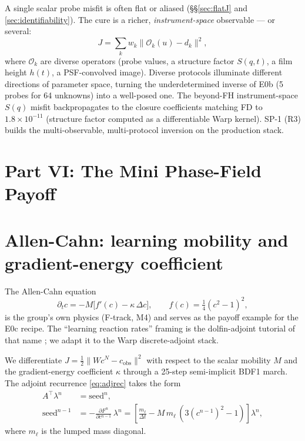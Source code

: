 \documentclass[11pt]{article}
\begin{document}
A single scalar probe misfit is often flat or aliased (\S\S\ref{sec:flatJ}
and \ref{sec:identifiability}).  The cure is a richer,
\emph{instrument-space} observable --- or several:
\begin{equation}
  J = \sum_k w_k \| \mathcal{O}_k(u) - d_k \|^2 ,
  \label{eq:multiJ}
\end{equation}
where $\mathcal{O}_k$ are diverse operators (probe values, a structure
factor $S(q,t)$, a film height $h(t)$, a PSF-convolved image).  Diverse
protocols illuminate different directions of parameter space, turning the
underdetermined inverse of E0b (5 probes for 64 unknowns) into a
well-posed one.  The beyond-FH instrument-space $S(q)$ misfit backpropagates
to the closure coefficients matching FD to $1.8 \times 10^{-11}$
(structure factor computed as a differentiable Warp kernel).  SP-1 (R3)
builds the multi-observable, multi-protocol inversion on the production
stack.

\section*{Part VI: The Mini Phase-Field Payoff}

\section{Allen-Cahn: learning mobility and gradient-energy coefficient}
\label{sec:acpayoff}

The Allen-Cahn equation
\begin{equation}
  \partial_t c = -M \bigl[ f'(c) - \kappa\,\Delta c \bigr],
  \qquad f(c) = \tfrac14(c^2-1)^2 ,
  \label{eq:ac}
\end{equation}
is the group's own physics (F-track, M4) and serves as the payoff example
for the E0c recipe.  The ``learning reaction rates'' framing is the
dolfin-adjoint tutorial of that name \cite{mitusch2019}; we adapt it to
the Warp discrete-adjoint stack.

We differentiate $J = \tfrac12 \|W c^N - c_{\mathrm{obs}}\|^2$ with
respect to the scalar mobility $M$ and the gradient-energy coefficient
$\kappa$ through a 25-step semi-implicit BDF1 march.  The adjoint
recurrence \eqref{eq:adjrec} takes the form
\begin{align}
  A^\top \lambda^n &= \mathrm{seed}^n, \label{eq:acadjrec}\\
  \mathrm{seed}^{n-1} &= -\frac{\partial F^n}{\partial c^{n-1}}\,\lambda^n
  = \left[\frac{m_\ell}{\Delta t} - M\, m_\ell\,(3(c^{n-1})^2 - 1)\right]\lambda^n,
  \label{eq:acseed}
\end{align}
where $m_\ell$ is the lumped mass diagonal.
\end{document}
